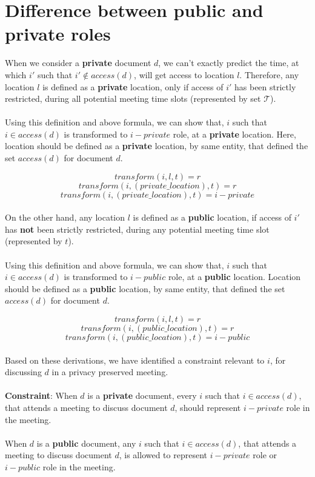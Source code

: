 \documentclass{article}
\begin{document}
\section{Difference between public and private roles}
When we consider a \textbf{private} document $d$, we can't exactly predict the time, at which $i'$ such that $i' \notin access(d)$, will get access to location $l$. 
Therefore, any location $l$ is defined as a \textbf{private} location, only if access of $i'$ has been strictly restricted, during all potential meeting time slots (represented by set $\mathcal{T}$).\\ \\
Using this definition and above formula, we can show that, $i$ such that $i \in access(d)$ is transformed to $i-private$ role, at a \textbf{private} location. 
Here, location should be defined as a \textbf{private} location, by same entity, that defined the set $access(d)$ for document $d$.

\[ transform(i, l, t) = r \]
\[ transform(i, (private\_location), t) = r \]
\[ transform(i, (private\_location), t) = i-private \] \\

\noindent
On the other hand, any location $l$ is defined as a \textbf{public} location, if access of $i'$ has \textbf{not} been strictly restricted, during any potential meeting time slot (represented by $t$).\\ \\
Using this definition and above formula, we can show that, $i$ such that $i \in access(d)$ is transformed to $i-public$ role, at a \textbf{public} location.
Location should be defined as a \textbf{public} location, by same entity, that defined the set $access(d)$ for document $d$.

\[ transform(i, l, t) = r \]
\[ transform(i, (public\_location), t) = r \]
\[ transform(i, (public\_location), t) = i-public \] \\
\noindent
Based on these derivations, we have identified a constraint relevant to $i$, for discussing $d$ in a privacy preserved meeting.\\ \\
\textbf{Constraint}: When $d$ is a \textbf{private} document, every $i$ such that $i \in access(d)$, that attends a meeting to discuss document $d$, should represent $i-private$ role in the meeting.\\ \\
When $d$ is a \textbf{public} document, any $i$ such that $i \in access(d)$, that attends a meeting to discuss document $d$, is allowed to represent $i-private$ role or $i-public$ role in the meeting.\\ \\
\end{document}
